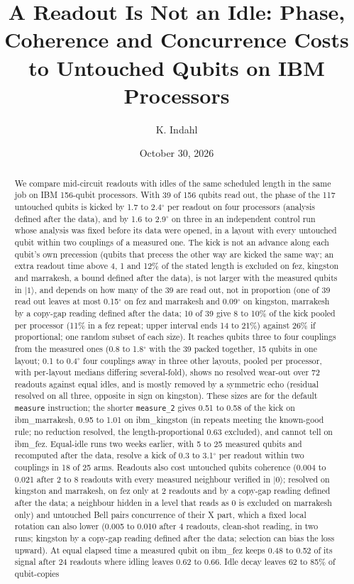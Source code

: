 \documentclass[reprint,amsmath,amssymb,aps,superscriptaddress,nofootinbib]{revtex4-2}
\begin{document}
\title{A Readout Is Not an Idle: Phase, Coherence and Concurrence Costs to Untouched Qubits on IBM Processors}

\author{K. Indahl}

\date{October 30, 2026}

\begin{abstract}
We compare mid-circuit readouts with idles of the same scheduled length in the same job on IBM 156-qubit processors. With 39 of 156 qubits read out, the phase of the 117 untouched qubits is kicked by 1.7 to 2.4$^\circ$ per readout on four processors (analysis defined after the data), and by 1.6 to 2.9$^\circ$ on three in an independent control run whose analysis was fixed before its data were opened, in a layout with every untouched qubit within two couplings of a measured one. The kick is not an advance along each qubit's own precession (qubits that precess the other way are kicked the same way; an extra readout time above 4, 1 and 12\% of the stated length is excluded on fez, kingston and marrakesh, a bound defined after the data), is not larger with the measured qubits in $|1\rangle$, and depends on how many of the 39 are read out, not in proportion (one of 39 read out leaves at most 0.15$^\circ$ on fez and marrakesh and 0.09$^\circ$ on kingston, marrakesh by a copy-gap reading defined after the data; 10 of 39 give 8 to 10\% of the kick pooled per processor (11\% in a fez repeat; upper interval ends 14 to 21\%) against 26\% if proportional; one random subset of each size). It reaches qubits three to four couplings from the measured ones (0.8 to 1.8$^\circ$ with the 39 packed together, 15 qubits in one layout; 0.1 to 0.4$^\circ$ four couplings away in three other layouts, pooled per processor, with per-layout medians differing several-fold), shows no resolved wear-out over 72 readouts against equal idles, and is mostly removed by a symmetric echo (residual resolved on all three, opposite in sign on kingston). These sizes are for the default \texttt{measure} instruction; the shorter \texttt{measure\_2} gives 0.51 to 0.58 of the kick on ibm\_marrakesh, 0.95 to 1.01 on ibm\_kingston (in repeats meeting the known-good rule; no reduction resolved, the length-proportional 0.63 excluded), and cannot tell on ibm\_fez. Equal-idle runs two weeks earlier, with 5 to 25 measured qubits and recomputed after the data, resolve a kick of 0.3 to 3.1$^\circ$ per readout within two couplings in 18 of 25 arms. Readouts also cost untouched qubits coherence (0.004 to 0.021 after 2 to 8 readouts with every measured neighbour verified in $|0\rangle$; resolved on kingston and marrakesh, on fez only at 2 readouts and by a copy-gap reading defined after the data; a neighbour hidden in a level that reads as 0 is excluded on marrakesh only) and untouched Bell pairs concurrence of their X part, which a fixed local rotation can also lower (0.005 to 0.010 after 4 readouts, clean-shot reading, in two runs; kingston by a copy-gap reading defined after the data; selection can bias the loss upward). At equal elapsed time a measured qubit on ibm\_fez keeps 0.48 to 0.52 of its signal after 24 readouts where idling leaves 0.62 to 0.66. Idle decay leaves 62 to 85\% of qubit-copies 
\end{abstract}
\end{document}
